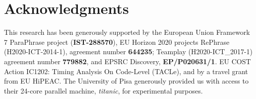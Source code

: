 \documentclass[final]{jfp1}
\begin{document}



\section*{Acknowledgments}

This research has been generously supported by the European Union Framework 7 ParaPhrase
project (\textbf{IST-288570}), EU Horizon 2020 projects RePhrase (H2020-ICT-2014-1), agreement number \textbf{644235}; 
Teamplay (H2020-ICT\_2017-1) agreement number \textbf{779882}, and EPSRC Discovery, \textbf{EP/P020631/1}.
EU COST Action IC1202: Timing  Analysis On Code-Level (TACLe), and by a travel
grant from EU HiPEAC.
The University of Pisa generously provided us with access to their 24-core parallel machine, \emph{titanic},
for experimental purposes.



\end{document}
